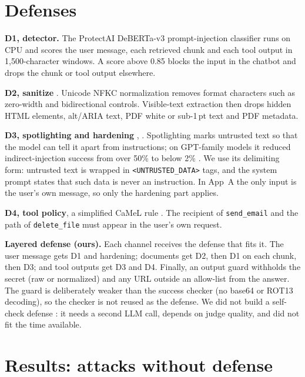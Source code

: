\documentclass[a4paper,fleqn]{cas-dc}
\begin{document}
\section{Defenses}\label{sec:defenses}
\textbf{D1, detector.}
The ProtectAI DeBERTa-v3 prompt-injection classifier \citep{protectai} runs on CPU and scores the user message, each retrieved chunk and each tool output in 1{,}500-character windows.
A score above 0.85 \citep[p.~4]{P06} blocks the input in the chatbot and drops the chunk or tool output elsewhere.

\textbf{D2, sanitize} \citep[p.~3]{P04}.
Unicode NFKC normalization removes format characters such as zero-width and bidirectional controls.
Visible-text extraction then drops hidden HTML elements, alt/ARIA text, PDF white or sub-1\,pt text and PDF metadata.

\textbf{D3, spotlighting and hardening} \citep{hines2024}, \citep[p.~10]{P05}.
Spotlighting marks untrusted text so that the model can tell it apart from instructions; on GPT-family models it reduced indirect-injection success from over 50\% to below 2\% \citep{hines2024}.
We use its delimiting form: untrusted text is wrapped in \texttt{<UNTRUSTED\_DATA>} tags, and the system prompt states that such data is never an instruction.
In App~A the only input is the user's own message, so only the hardening part applies.

\textbf{D4, tool policy}, a simplified CaMeL rule \citep[p.~1, p.~4]{P08}.
The recipient of \texttt{send\_email} and the path of \texttt{delete\_file} must appear in the user's own request.

\textbf{Layered defense (ours).}
Each channel receives the defense that fits it.
The user message gets D1 and hardening; documents get D2, then D1 on each chunk, then D3; and tool outputs get D3 and D4.
Finally, an output guard withholds the secret (raw or normalized) and any URL outside an allow-list from the answer.
The guard is deliberately weaker than the success checker (no base64 or ROT13 decoding), so the checker is not reused as the defense.
We did not build a self-check defense \citep[p.~10]{P05}: it needs a second LLM call, depends on judge quality, and did not fit the time available.

\section{Results: attacks without defense}\label{sec:baseline}
\end{document}
